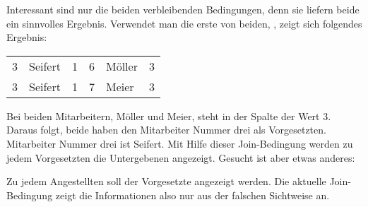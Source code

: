 Interessant sind nur die beiden verbleibenden Bedingungen, denn sie liefern beide ein sinnvolles Ergebnis. Verwendet man die erste von beiden, , zeigt sich folgendes Ergebnis:
\begin{center}
    \begin{small}
        \tablehead{}
        \tabletail {}
        \tablelasttail {}
        \begin{msoraclesql}
            \begin{supertabular}{rlrrlr}
                3 & Seifert & 1 & 6 & Möller & 3 \\
                3 & Seifert & 1 & 7 & Meier & 3 \\
            \end{supertabular}
        \end{msoraclesql}
    \end{small}
\end{center}
Bei beiden Mitarbeitern, Möller und Meier, steht in der Spalte  der Wert 3. Daraus folgt, beide haben den Mitarbeiter Nummer drei als Vorgesetzten. Mitarbeiter Nummer drei ist Seifert. Mit Hilfe dieser Join-Bedingung werden zu jedem Vorgesetzten die Untergebenen angezeigt. Gesucht ist aber etwas anderes:

Zu jedem Angestellten soll der Vorgesetzte angezeigt werden. Die aktuelle Join-Bedingung zeigt die Informationen also nur aus der falschen Sichtweise an.


